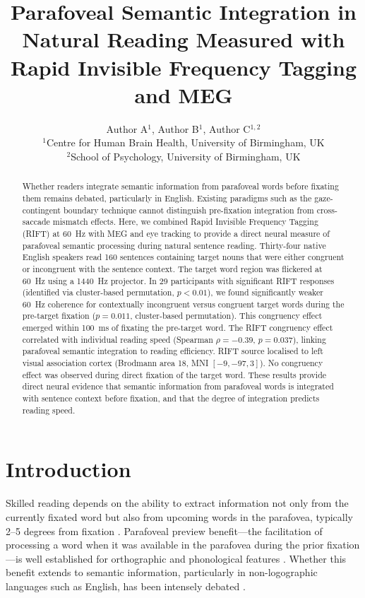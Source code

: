 \documentclass[11pt]{article}
\title{Parafoveal Semantic Integration in Natural Reading Measured with Rapid Invisible Frequency Tagging and MEG}
\author{Author A$^{1}$, Author B$^{1}$, Author C$^{1,2}$\\
\small $^{1}$Centre for Human Brain Health, University of Birmingham, UK\\
\small $^{2}$School of Psychology, University of Birmingham, UK}
\date{}
\begin{document}
\maketitle

\begin{abstract}
Whether readers integrate semantic information from parafoveal words before fixating them remains debated, particularly in English. Existing paradigms such as the gaze-contingent boundary technique cannot distinguish pre-fixation integration from cross-saccade mismatch effects. Here, we combined Rapid Invisible Frequency Tagging (RIFT) at 60~Hz with MEG and eye tracking to provide a direct neural measure of parafoveal semantic processing during natural sentence reading. Thirty-four native English speakers read 160 sentences containing target nouns that were either congruent or incongruent with the sentence context. The target word region was flickered at 60~Hz using a 1440~Hz projector. In 29 participants with significant RIFT responses (identified via cluster-based permutation, $p < 0.01$), we found significantly weaker 60~Hz coherence for contextually incongruent versus congruent target words during the pre-target fixation ($p = 0.011$, cluster-based permutation). This congruency effect emerged within 100~ms of fixating the pre-target word. The RIFT congruency effect correlated with individual reading speed (Spearman $\rho = -0.39$, $p = 0.037$), linking parafoveal semantic integration to reading efficiency. RIFT source localised to left visual association cortex (Brodmann area 18, MNI $[-9, -97, 3]$). No congruency effect was observed during direct fixation of the target word. These results provide direct neural evidence that semantic information from parafoveal words is integrated with sentence context before fixation, and that the degree of integration predicts reading speed.
\end{abstract}

\section{Introduction}

Skilled reading depends on the ability to extract information not only from the currently fixated word but also from upcoming words in the parafovea, typically 2--5 degrees from fixation \citep{rayner1975parafoveal, rayner1998eye}. Parafoveal preview benefit---the facilitation of processing a word when it was available in the parafovea during the prior fixation---is well established for orthographic and phonological features \citep{schotter2012parafoveal}. Whether this benefit extends to semantic information, particularly in non-logographic languages such as English, has been intensely debated \citep{schotter2015does, hohenstein2010semantic, pan2021parafoveal}.
\end{document}
